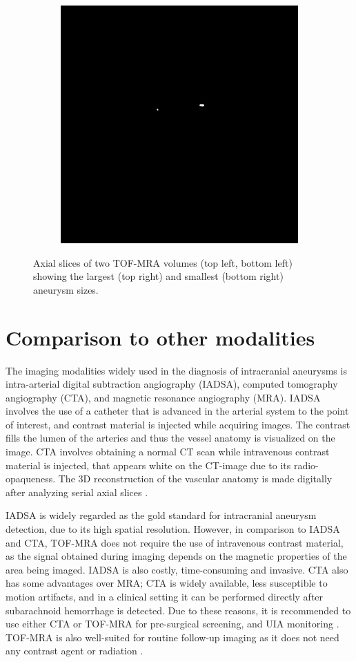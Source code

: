 \begin{figure}
\begin{subfigure}{0.9\linewidth}
		\includegraphics[width=0.5\linewidth]{figures/aneu-min.png}
	\end{subfigure}
	\caption[TOF-MRA axial slices and corresponding aneurysm label axial slices]{Axial slices of two TOF-MRA volumes (top left, bottom left) showing the largest (top right) and smallest (bottom right) aneurysm sizes.}
	\label{fig:ax-tof-aneus.png}
\end{figure}


\section{Comparison to other modalities}
The imaging modalities widely used in the diagnosis of intracranial aneurysms is intra-arterial digital subtraction angiography (IADSA), computed tomography angiography (CTA), and magnetic resonance angiography (MRA). IADSA involves the use of a catheter that is advanced in the arterial system to the point of interest, and contrast material is injected while acquiring images. The contrast fills the lumen of the arteries and thus the vessel anatomy is visualized on the image. CTA involves obtaining a normal CT scan while intravenous contrast material is injected, that appears white on the CT-image due to its radio-opaqueness. The 3D reconstruction of the vascular anatomy is made digitally after analyzing serial axial slices \cite{Keedy2006}.

IADSA is widely regarded as the gold standard for intracranial aneurysm detection, due to its high spatial resolution. However, in comparison to IADSA and CTA, TOF-MRA does not require the use of intravenous contrast material, as the signal obtained during imaging depends on the magnetic properties of the area being imaged. IADSA is also costly, time-consuming and invasive. CTA also has some advantages over MRA; CTA is widely available, less susceptible to motion artifacts, and in a clinical setting it can be performed directly after subarachnoid hemorrhage is detected. Due to these reasons, it is recommended to use either CTA or TOF-MRA for pre-surgical screening, and UIA monitoring \cite{Keedy2006, Sailer2014, Wardlaw2000}. TOF-MRA is also well-suited for routine follow-up imaging as it does not need any contrast agent or radiation \cite{Lane2015}.

